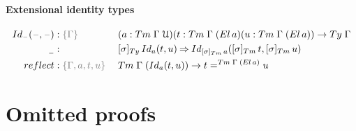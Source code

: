 \documentclass[a4paper,UKenglish,numberwithinsect,cleveref,thm-restate]{lipics-v2021}
\begin{document}
\paragraph*{Extensional identity types}

\begin{alignat*}{5}
  \idtype[\blank]{\blank}{\blank} & : \implicit{\Gamma} && (a : \Tm\;\Gamma\;\UU) (t : \Tm\;\Gamma\;(\El\,a)(u : \Tm\;\Gamma\;(\El\,a)) \to \Ty\;\Gamma \\
  \nameless & : && [ \sigma ]_{\Ty}\, \idtype[a]{t}{u} \reduce \idtype[{[\sigma]_{\Tm}\,a}]{[\sigma]_{\Tm}\,t}{[\sigma]_{\Tm}\,u} \\
  \mathsf{reflect} & : \implicit{\Gamma, a, t, u}\;&& \Tm\;\Gamma\;(\idtype[a]{t}{u}) \to t =^{\Tm\;\Gamma\;(\El\,a)} u
\end{alignat*}


\section{Omitted proofs}
\end{document}
